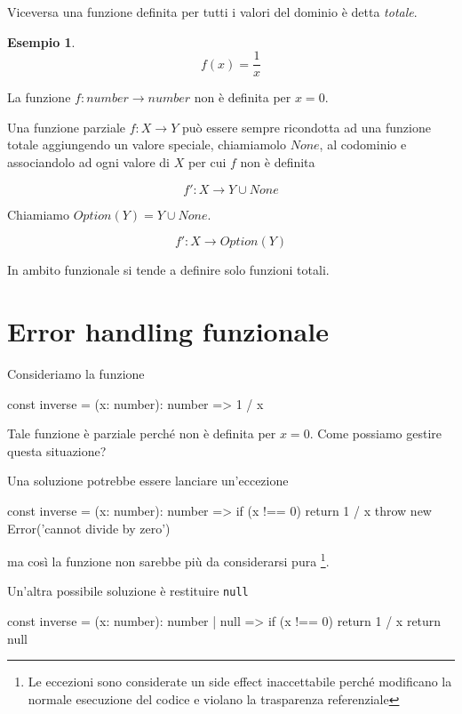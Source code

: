 \documentclass[12pt]{article}
\theoremstyle{definition}
\newtheorem{example}{Esempio}[section]
\newenvironment{code}
  {\vspace{0.5cm} \VerbatimEnvironment\begin{typescriptcode}}
  {\end{typescriptcode} \vspace{0.2cm}}
\begin{document}
Viceversa una funzione definita per tutti i valori del dominio è detta \emph{totale}.

\begin{example}
$$
f(x) = \frac{1}{x}
$$
\end{example}

La funzione $f: number \rightarrow number$ non è definita per $x = 0$.

Una funzione parziale $f: X \rightarrow Y$ può essere sempre ricondotta ad una funzione totale aggiungendo un valore speciale,
chiamiamolo $None$, al codominio e associandolo ad ogni valore di $X$ per cui $f$ non è definita

$$
f': X \rightarrow Y \cup None
$$

Chiamiamo $Option(Y) = Y \cup None$.

$$
f': X \rightarrow Option(Y)
$$

In ambito funzionale si tende a definire solo funzioni totali.

\newpage

\section{Error handling funzionale}

Consideriamo la funzione

\begin{code}
const inverse = (x: number): number => 1 / x
\end{code}

Tale funzione è parziale perché non è definita per $x = 0$. Come possiamo gestire questa situazione?

Una soluzione potrebbe essere lanciare un'eccezione

\begin{code}
const inverse = (x: number): number => {
  if (x !== 0) return 1 / x
  throw new Error('cannot divide by zero')
}
\end{code}

ma così la funzione non sarebbe più da considerarsi pura
\footnote{Le eccezioni sono considerate un side effect inaccettabile perché modificano la normale esecuzione del codice
e violano la trasparenza referenziale}.

Un'altra possibile soluzione è restituire \texttt{null}

\begin{code}
const inverse = (x: number): number | null => {
  if (x !== 0) return 1 / x
  return null
}
\end{code}
\end{document}
